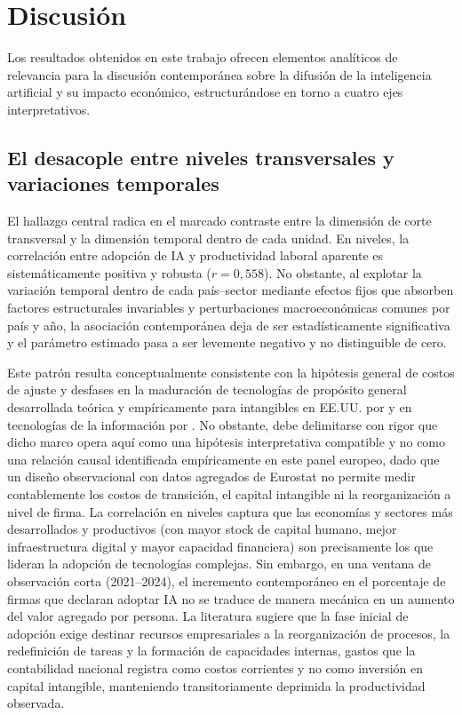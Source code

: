 \documentclass[12pt,a4paper]{article}
\begin{document}
\section{Discusión}

Los resultados obtenidos en este trabajo ofrecen elementos analíticos de relevancia para la discusión contemporánea sobre la difusión de la inteligencia artificial y su impacto económico, estructurándose en torno a cuatro ejes interpretativos.

\subsection{El desacople entre niveles transversales y variaciones temporales}

El hallazgo central radica en el marcado contraste entre la dimensión de corte transversal y la dimensión temporal dentro de cada unidad. En niveles, la correlación entre adopción de IA y productividad laboral aparente es sistemáticamente positiva y robusta ($r = 0,558$). No obstante, al explotar la variación temporal dentro de cada país--sector mediante efectos fijos que absorben factores estructurales invariables y perturbaciones macroeconómicas comunes por país y año, la asociación contemporánea deja de ser estadísticamente significativa y el parámetro estimado pasa a ser levemente negativo y no distinguible de cero.

Este patrón resulta conceptualmente consistente con la hipótesis general de costos de ajuste y desfases en la maduración de tecnologías de propósito general desarrollada teórica y empíricamente para intangibles en EE.UU. por \citet{brynjolfsson2021productivity} y en tecnologías de la información por \citet{bresnahan2002information}. No obstante, debe delimitarse con rigor que dicho marco opera aquí como una hipótesis interpretativa compatible y no como una relación causal identificada empíricamente en este panel europeo, dado que un diseño observacional con datos agregados de Eurostat no permite medir contablemente los costos de transición, el capital intangible ni la reorganización a nivel de firma. La correlación en niveles captura que las economías y sectores más desarrollados y productivos (con mayor stock de capital humano, mejor infraestructura digital y mayor capacidad financiera) son precisamente los que lideran la adopción de tecnologías complejas. Sin embargo, en una ventana de observación corta (2021--2024), el incremento contemporáneo en el porcentaje de firmas que declaran adoptar IA no se traduce de manera mecánica en un aumento del valor agregado por persona. La literatura sugiere que la fase inicial de adopción exige destinar recursos empresariales a la reorganización de procesos, la redefinición de tareas y la formación de capacidades internas, gastos que la contabilidad nacional registra como costos corrientes y no como inversión en capital intangible, manteniendo transitoriamente deprimida la productividad observada.
\end{document}
